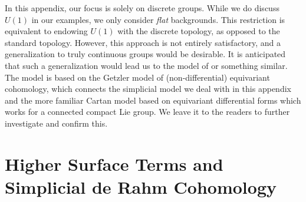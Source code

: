 \documentclass[11pt,toc=bibliography]{scrbook}
\numberwithin{equation}{section}
\begin{document}
\begin{tcolorbox}[enhanced jigsaw, opacityback=0, opacitybacktitle=0.6, leftrule=.75mm, arc=.35mm, coltitle=black, breakable, colframe=quarto-callout-warning-color-frame, titlerule=0mm, colback=white, bottomrule=.15mm, left=2mm, colbacktitle=quarto-callout-warning-color!10!white, toptitle=1mm, bottomtitle=1mm, title=\textcolor{quarto-callout-warning-color}{\faExclamationTriangle}\hspace{0.5em}{Warning \ref*{wrn-discrete-group}: Warning: we do not treat Lie groups honestly here}, rightrule=.15mm, toprule=.15mm]


In this appendix, our focus is solely on discrete groups. While we do
discuss \(U(1)\) in our examples, we only consider \emph{flat}
backgrounds. This restriction is equivalent to endowing \(U(1)\) with
the discrete topology, as opposed to the standard topology. However,
this approach is not entirely satisfactory, and a generalization to
truly continuous groups would be desirable. It is anticipated that such
a generalization would lead us to the model of
\autocite{kubel2018equivariant} or something similar.\footnotemark{} The
model is based on the Getzler model of (non-differential) equivariant
cohomology, which connects the simplicial model we deal with in this
appendix and the more familiar Cartan model based on equivariant
differential forms which works for a connected compact Lie group. We
leave it to the readers to further investigate and confirm this.

\end{tcolorbox}


\section{Higher Surface Terms and Simplicial de Rahm
Cohomology}\label{sec-simplicial-cohomology}
\end{document}
